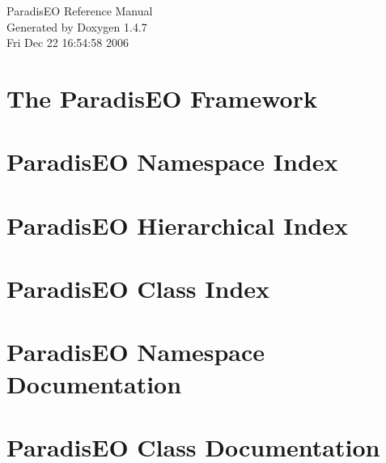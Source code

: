 \documentclass[a4paper]{book}
\begin{document}
\begin{titlepage}
\vspace*{7cm}
\begin{center}
{\Large Paradis\-EO Reference Manual}\\
\vspace*{1cm}
{\large Generated by Doxygen 1.4.7}\\
\vspace*{0.5cm}
{\small Fri Dec 22 16:54:58 2006}\\
\end{center}
\end{titlepage}
\clearemptydoublepage
{}
\tableofcontents
\clearemptydoublepage
{}
\chapter{The Paradis\-EO Framework }
\label{index}
\chapter{Paradis\-EO Namespace Index}

\chapter{Paradis\-EO Hierarchical Index}

\chapter{Paradis\-EO Class Index}

\chapter{Paradis\-EO Namespace Documentation}

\chapter{Paradis\-EO Class Documentation}






































\printindex
\end{document}
